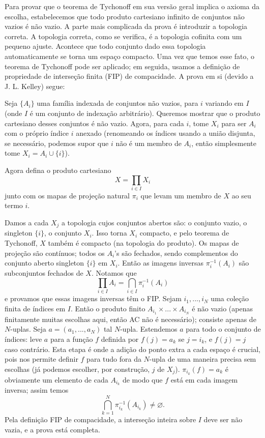 
Para provar que o teorema de Tychonoff em sua versão geral implica o axioma da escolha, estabelecemos que todo produto cartesiano infinito de conjuntos não vazios é não vazio. A parte mais complicada da prova é introduzir a topologia correta. A topologia correta, como se verifica, é a topologia cofinita com um pequeno ajuste. Acontece que todo conjunto dado essa topologia automaticamente se torna um espaço compacto. Uma vez que temos esse fato, o teorema de Tychonoff pode ser aplicado; em seguida, usamos a definição de propriedade de interseção finita (FIP) de compacidade. A prova em si (devido a J. L. Kelley) segue:

Seja $\{A_i\}$ uma família indexada de conjuntos não vazios, para $i$ variando em $I$ (onde $I$ é um conjunto de indexação arbitrário). Queremos mostrar que o produto cartesiano desses conjuntos é não vazio. Agora, para cada $i$, tome $X_i$ para ser $A_i$ com o próprio índice $i$ anexado (renomeando os índices usando a união disjunta, se necessário, podemos supor que $i$ não é um membro de $A_i$, então simplesmente tome $X_i = A_i \cup \{i\}$).

Agora defina o produto cartesiano
$$
X = \prod_{i \in I} X_i
$$
junto com os mapas de projeção natural $\pi_i$ que levam um membro de $X$ ao seu termo $i$.

Damos a cada $X_j$ a topologia cujos conjuntos abertos são: o conjunto vazio, o singleton $\{i\}$, o conjunto $X_i$. Isso torna $X_i$ compacto, e pelo teorema de Tychonoff, $X$ também é compacto (na topologia do produto). Os mapas de projeção são contínuos; todos os $A_i$'s são fechados, sendo complementos do conjunto aberto singleton $\{i\}$ em $X_i$. Então as imagens inversas $\pi_i^{-1}(A_i)$ são subconjuntos fechados de $X$. Notamos que
$$
\prod_{i \in I} A_i = \bigcap_{i \in I} \pi_i^{-1}(A_i)
$$
e provamos que essas imagens inversas têm o FIP. Sejam $i_1, ..., i_N$ uma coleção finita de índices em $I$. Então o produto finito $A_{i_1} \times ... \times A_{i_N}$ é não vazio (apenas finitamente muitas escolhas aqui, então AC não é necessário); consiste apenas de $N$-uplas. Seja $a = (a_1, ..., a_N)$ tal $N$-upla. Estendemos $a$ para todo o conjunto de índices: leve $a$ para a função $f$ definida por $f(j) = a_k$ se $j = i_k$, e $f(j) = j$ caso contrário. Esta etapa é onde a adição do ponto extra a cada espaço é crucial, pois nos permite definir $f$ para tudo fora da $N$-upla de uma maneira precisa sem escolhas (já podemos escolher, por construção, $j$ de $X_j$). $\pi_{i_k}(f) = a_k$ é obviamente um elemento de cada $A_{i_k}$ de modo que $f$ está em cada imagem inversa; assim temos
$$
\bigcap_{k=1}^{N} \pi_{i_k}^{-1}(A_{i_k}) \neq \varnothing.
$$
Pela definição FIP de compacidade, a interseção inteira sobre $I$ deve ser não vazia, e a prova está completa.

